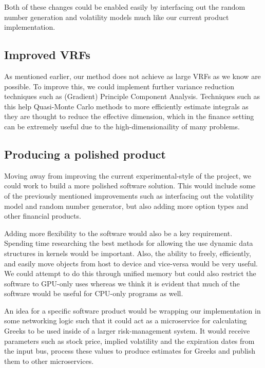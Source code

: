 Both of these changes could be enabled easily by interfacing out the random number generation and volatility models much like our current product implementation.

\subsection{Improved VRFs}
As mentioned earlier, our method does not achieve as large VRFs as we know are possible. To improve this, we could implement further variance reduction techniques such as (Gradient) Principle Component Analysis. Techniques such as this help Quasi-Monte Carlo methods to more efficiently estimate integrals as they are thought to reduce the effective dimension, which in the finance setting can be extremely useful due to the high-dimensionaility of many problems.

\subsection{Producing a polished product}
Moving away from improving the current experimental-style of the project, we could work to build a more polished software solution. This would include some of the previously mentioned improvements such as interfacing out the volatility model and random number generator, but also adding more option types and other financial products. 

Adding more flexibility to the software would also be a key requirement. Spending time researching the best methods for allowing the use dynamic data structures in kernels would be important. Also, the ability to freely, efficiently, and easily move objects from host to device and vice-versa would be very useful. We could attempt to do this through unified memory but could also restrict the software to GPU-only uses whereas we think it is evident that much of the software would be useful for CPU-only programs as well.

An idea for a specific software product would be wrapping our implementation in some networking logic such that it could act as a microservice for calculating Greeks to be used inside of a larger risk-management system. It would receive parameters such as stock price, implied volatility and the expiration dates from the input bus, process these values to produce estimates for Greeks and publish them to other microservices.